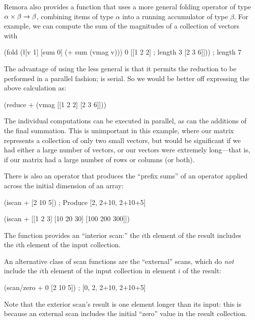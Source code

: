 Remora also provides a  function that uses a more general
folding operator of type $\alpha \times \beta \rightarrow \beta$,
combining items of type $\alpha$ into a running accumulator of type $\beta$.
For example, we can compute the sum of the magnitudes of a collection of
vectors with
\begin{code}
    (fold (\l{[v 1] [sum 0]} (+ sum (vmag v)))
          0
          [[1 2 2]      ; length 3
           [2 3 6]]))   ; length 7
\end{code}
The advantage of using the less general  is that it permits
the reduction to be performed in a parallel fashion;
 is serial.
So we would be better off expressing the above calculation as:
\begin{code}
(reduce + (vmag [[1 2 2]
                 [2 3 6]]))\end{code}
The individual  computations can be executed in parallel,
as can the additions of the final summation.
This is unimportant in this example, 
where our matrix represents a collection of only two small vectors, 
but would be significant if we had either a large number of vectors,
or our vectors were extremely long---that is,
if our matrix had a large number of rows or columns (or both).

There is also an  operator that produces the ``prefix sums''
of an operator applied across the initial dimension of an array:
\begin{code}
    (iscan + [2 10 5]) ; Produce [2, 2+10, 2+10+5]
\result{[2 12 17]}

    (iscan + [[1     2   3]
              [10   20  30]
              [100 200 300]])
\end{code}
%
The  function provides an ``interior scan:''
the $i\text{th}$ element of the result includes the
$i\text{th}$ element of the input collection.

An alternative class of scan functions are the ``external'' scans,
which do \emph{not} include the $i\text{th}$ element of the input
collection in element $i$ of the result:
\begin{code}
    (scan/zero + 0 [2 10 5]) ; [0, 2, 2+10, 2+10+5]
\result{[0 2 12 17]}\end{code}
Note that the exterior scan's result is one element longer than
its input:
this is because an external scan includes the initial ``zero'' value
in the result collection.

